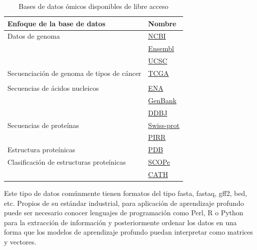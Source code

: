 \begin{table}[h!]
    \scriptsize
    \centering
    \caption{Bases de datos ómicos disponibles de libre acceso}
    
    \begin{tabular}{
    >{\centering\arraybackslash}m{6cm} 
    >{\centering\arraybackslash}m{3cm}}
\hline 
        \textbf{Enfoque de la base de datos} & 
        \textbf{Nombre}
\\      
    \hline \hline 

     Datos de genoma &
    {\href{https://www.ncbi.nlm.nih.gov/genome}{NCBI}}
    \\
    &
     {\href{https://www.ensembl.org/index.html}{Ensembl}}
     \\
      &
      {\href{https://www.ensembl.org/index.html}{UCSC}}
     \\
\hline
      Secuenciación de genoma de tipos de cáncer &
     {\href{https://portal.gdc.cancer.gov/}{TCGA}}
    \\
    \\
\hline
      Secuencias de ácidos nucleicos
     &
     {\href{https://www.ebi.ac.uk/ena/browser/home}{ENA}}
     \\
     &
     {\href{https://www.ncbi.nlm.nih.gov/genbank/}{GenBank}} 
     \\
     &
     {\href{https://www.ddbj.nig.ac.jp/index-e.html}{DDBJ}}
     \\
\hline
     Secuencias de proteínas &
     {\href{https://www.uniprot.org/uniprotkb/P51587/entry}{Swiss-prot}}
\\ 
     &
     {\href{https://proteininformationresource.org/}{PIRR}}
     \\
\hline 
     Estructura proteínicas
     &
     {\href{https://www.rcsb.org/pdb}{PDB}}
     \\
\hline     
     Clasificación de estructuras proteínicas &
     {\href{https://scop.berkeley.edu/}{SCOPe}}
     \\
     &
{\href{http://www.cathdb.info/}{CATH}}
     \\
    \hline 
    \end{tabular}
    \label{tab:bases_de_datos}
\end{table}

Este tipo de datos comúnmente tienen formatos del tipo fasta, fastaq, gff2, bed, etc. Propios de su estándar industrial, para aplicación de aprendizaje profundo puede ser necesario conocer lenguajes de programación como Perl, R o Python para la extracción de información y posteriormente ordenar los datos en una forma que los modelos de aprendizaje profundo puedan interpretar como matrices y vectores.

